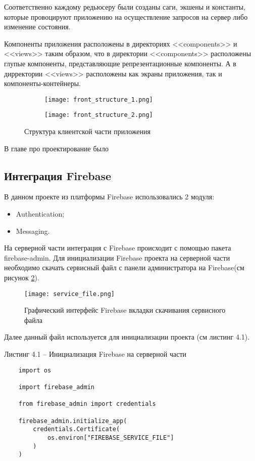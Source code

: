 Соответственно каждому редьюсеру были созданы саги, экшены и константы, которые провоцируют приложению на осуществление запросов на сервер либо изменение состояния.

Компоненты приложения расположены в директориях <<components>> и <<views>> таким образом, что в директории <<components>> расположены глупые компоненты, представляющие репрезентационные компоненты.
А в дирректории <<views>> расположены как экраны приложения, так и компоненты-контейнеры.
\begin{figure}[h]
    \begin{subfigure}[b]{0.45\textwidth}
    \centering
    \texttt{[image: front\_structure\_1.png]}
    \caption{}
    \end{subfigure}
    \begin{subfigure}[b]{0.3\textwidth}
    \centering
    \texttt{[image: front\_structure\_2.png]}
    \caption{}
    \end{subfigure}
    \caption{ Структура клиентской части приложения }
    \label{front:struct}
\end{figure}

В главе про проектирование было


\subsection{Интеграция Firebase}
В данном проекте из платформы Firebase использовались 2 модуля:
\begin{itemize}
    \item Authentication;
    \item Messaging.
\end{itemize}

На серверной части интеграция с Firebase происходит с помощью пакета firebase-admin.
Для инициализации Firebase проекта на серверной части необходимо скачать сервисный файл с панели администратора на Firebase(см рисунок \ref{fire:admin}).

\begin{figure}[ht]
    \centering
    \texttt{[image: service\_file.png]}
    \caption{ Графический интерфейс Firebase вкладки скачивания сервисного файла }
    \label{fire:admin}
\end{figure}

Далее данный файл используется для инициализации проекта (см листинг 4.1).

Листинг 4.1 – Инициализация Firebase на серверной части
\begin{lstlisting}
    import os

    import firebase_admin

    from firebase_admin import credentials

    firebase_admin.initialize_app(
        credentials.Certificate(
            os.environ["FIREBASE_SERVICE_FILE"]
        )
    )
\end{lstlisting}

